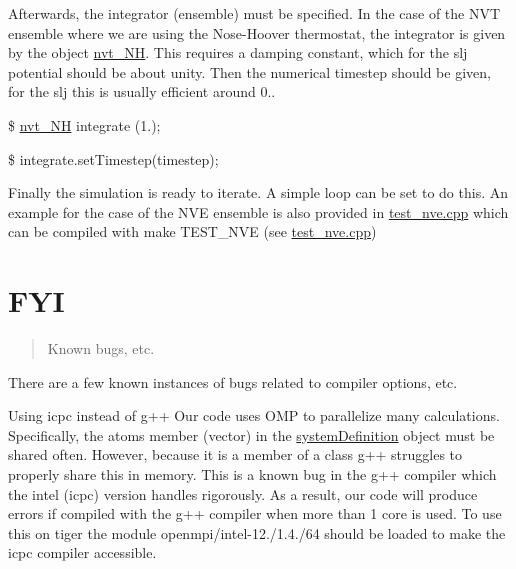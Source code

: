 \begin{DoxyEnumerate}
\item Afterwards, the integrator (ensemble) must be specified. In the case of the N\-V\-T ensemble where we are using the Nose-\/\-Hoover thermostat, the integrator is given by the object \hyperlink{classnvt___n_h}{nvt\-\_\-\-N\-H}. This requires a damping constant, which for the slj potential should be about unity. Then the numerical timestep should be given, for the slj this is usually efficient around 0..

\$ \hyperlink{classnvt___n_h}{nvt\-\_\-\-N\-H} integrate (1.);

\$ integrate.\-set\-Timestep(timestep);
\end{DoxyEnumerate}


\begin{DoxyEnumerate}
\item Finally the simulation is ready to iterate. A simple loop can be set to do this. An example for the case of the N\-V\-E ensemble is also provided in \hyperlink{test__nve_8cpp_source}{test\-\_\-nve.\-cpp} which can be compiled with make T\-E\-S\-T\-\_\-\-N\-V\-E (see \hyperlink{test__nve_8cpp_source}{test\-\_\-nve.\-cpp})
\end{DoxyEnumerate}

\section*{F\-Y\-I}

\begin{quotation}
Known bugs, etc.

\end{quotation}


There are a few known instances of bugs related to compiler options, etc.


\begin{DoxyEnumerate}
\item Using icpc instead of g++ Our code uses O\-M\-P to parallelize many calculations. Specifically, the atoms member (vector) in the \hyperlink{classsystem_definition}{system\-Definition} object must be shared often. However, because it is a member of a class g++ struggles to properly share this in memory. This is a known bug in the g++ compiler which the intel (icpc) version handles rigorously. As a result, our code will produce errors if compiled with the g++ compiler when more than 1 core is used. To use this on tiger the module openmpi/intel-\/12./1.4./64 should be loaded to make the icpc compiler accessible.
\end{DoxyEnumerate}


